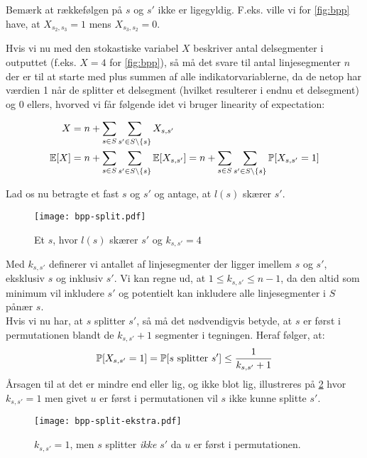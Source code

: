 Bemærk at rækkefølgen på $s$ og $s'$ ikke er ligegyldig. F.eks. ville vi for \ref{fig:bpp} have, at $X_{s_2, s_3} = 1$ mens $X_{s_3, s_2} = 0$.

Hvis vi nu med den stokastiske variabel $X$ beskriver antal delsegmenter i outputtet (f.eks. $X = 4$ for \ref{fig:bpp}), så må det svare til antal linjesegmenter $n$ der er til at starte med plus summen af alle indikatorvariablerne, da de netop har værdien 1 når de splitter et delsegment (hvilket resulterer i endnu et delsegment) og 0 ellers, hvorved vi får følgende idet vi bruger linearity of expectation:

\begin{align}
    X     &= n + \sum_{s \in S} \sum_{s' \in S \backslash \{ s\}} X_{s, s'} \nonumber \\
    \e[X] &= n + \sum_{s \in S} \sum_{s' \in S \backslash \{ s\}} \e[X_{s, s'}]
           = n + \sum_{s \in S} \sum_{s' \in S \backslash \{ s\}} \P[X_{s, s'} = 1] \label{eq:bpp-X-init}
\end{align}

Lad os nu betragte et fast $s$ og $s'$ og antage, at $l(s)$ skærer $s'$.
\begin{figure}[H]
    \begin{center}
    \texttt{[image: bpp-split.pdf]}
    \end{center}
    \caption{Et $s$, hvor $l(s)$ skærer $s'$ og $k_{s, s'} = 4$}
    \label{fig:bpp-split}
\end{figure}


Med $k_{s, s'}$ definerer vi antallet af linjesegmenter der ligger imellem $s$ og $s'$, eksklusiv $s$ og inklusiv $s'$. Vi kan regne ud, at $1 \leq k_{s, s'} \leq n-1$, da den altid som minimum vil inkludere $s'$ og potentielt kan inkludere alle linjesegmenter i $S$ pånær $s$.\\

Hvis vi nu har, at $s$ splitter $s'$, så må det nødvendigvis betyde, at $s$ er først i permutationen blandt de $k_{s, s'} + 1$ segmenter i tegningen. Heraf følger, at:
\begin{align} \label{eq:bpp-prob-split}
    \P[X_{s, s'} = 1] = \P[\text{$s$ splitter $s'$}] \leq \frac{1}{k_{s, s'} + 1}
\end{align}
Årsagen til at det er mindre end eller lig, og ikke blot lig, illustreres på \ref{fig:bpp-split-ekstra} hvor $k_{s, s'} = 1$ men givet $u$ er først i permutationen vil $s$ ikke kunne splitte $s'$.

\begin{figure}[H]
  \begin{center}
  \texttt{[image: bpp-split-ekstra.pdf]}
  \end{center}
  \caption{$k_{s, s'} = 1$, men $s$ splitter \emph{ikke} $s'$ da $u$ er først i permutationen.}
  \label{fig:bpp-split-ekstra}
\end{figure}


